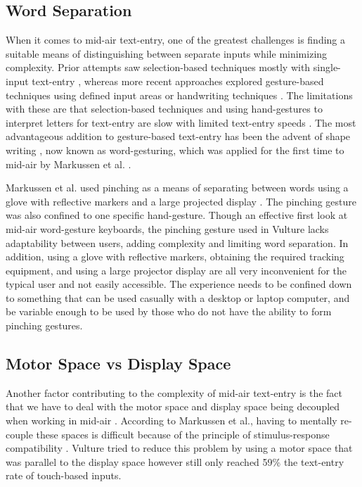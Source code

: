 \subsection{Word Separation}
When it comes to mid-air text-entry, one of the greatest challenges is finding a suitable means of distinguishing between separate inputs while minimizing complexity. Prior attempts saw selection-based techniques mostly with single-input text-entry \cite{ref_selection_based_mid_air,ref_mid_air_text_large_displays}, whereas more recent approaches explored gesture-based techniques \cite{ref_airstroke,ref_graffiti_vs_unistroke,ref_continuous_recognition} using defined input areas or handwriting techniques \cite{ref_air_handwriting,ref_air_writing_continuous_recognition,ref_mid_air_text_entry_handwriting,ref_detecting_handwritten_characters}. The limitations with these are that selection-based techniques and using hand-gestures to interpret letters for text-entry are slow with limited text-entry speeds \cite{ref_selection_based_mid_air,ref_mid_air_text_large_displays}. The most advantageous addition to gesture-based text-entry has been the advent of shape writing \cite{ref_shape_writing,ref_the_word_gesture_keyboard,ref_shapewriter_iphone,ref_shark_wgk,ref_shorthand_writing}, now known as word-gesturing, which was applied for the first time to mid-air by Markussen et al. \cite{ref_vulture}.

Markussen et al. used pinching as a means of separating between words using a glove with reflective markers and a large projected display \cite{ref_vulture}. The pinching gesture was also confined to one specific hand-gesture. Though an effective first look at mid-air word-gesture keyboards, the pinching gesture used in Vulture lacks adaptability between users, adding complexity and limiting word separation. In addition, using a glove with reflective markers, obtaining the required tracking equipment, and using a large projector display are all very inconvenient for the typical user and not easily accessible. The experience needs to be confined down to something that can be used casually with a desktop or laptop computer, and be variable enough to be used by those who do not have the ability to form pinching gestures.

\subsection{Motor Space vs Display Space}
Another factor contributing to the complexity of mid-air text-entry is the fact that we have to deal with the motor space and display space being decoupled when working in mid-air \cite{ref_vulture}. According to Markussen et al., having to mentally re-couple these spaces is difficult because of the principle of stimulus-response compatibility \cite{ref_stimulus_response_compatibility}. Vulture tried to reduce this problem by using a motor space that was parallel to the display space however still only reached 59\% the text-entry rate of touch-based inputs.


